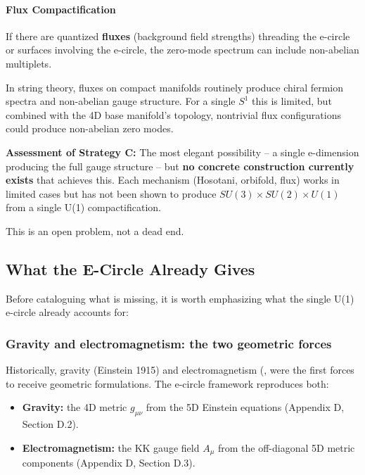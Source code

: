 \documentclass[aps,prd,preprint,superscriptaddress,longbibliography,floatfix]{revtex4-2}
\theoremstyle{remark}
\begin{document}
\paragraph{Flux Compactification}

If there are quantized \textbf{fluxes} (background field strengths) threading the e-circle or surfaces involving the e-circle, the zero-mode spectrum can include non-abelian multiplets.

In string theory, fluxes on compact manifolds routinely produce chiral fermion spectra and non-abelian gauge structure. For a single $S^1$ this is limited, but combined with the 4D base manifold's topology, nontrivial flux configurations could produce non-abelian zero modes.

\textbf{Assessment of Strategy C:} The most elegant possibility -- a single e-dimension producing the full gauge structure -- but \textbf{no concrete construction currently exists} that achieves this. Each mechanism (Hosotani, orbifold, flux) works in limited cases but has not been shown to produce $SU(3) \times SU(2) \times U(1)$ from a single U(1) compactification.

This is an open problem, not a dead end.



\subsection{What the E-Circle Already Gives}

Before cataloguing what is missing, it is worth emphasizing what the single U(1) e-circle already accounts for:


\subsubsection{Gravity and electromagnetism: the two geometric forces}

Historically, gravity (Einstein 1915) and electromagnetism (\cite{Kaluza1921}, \cite{Klein1926} were the first forces to receive geometric formulations. The e-circle framework reproduces both:


\begin{itemize}
  \item \textbf{Gravity:} the 4D metric $g_{\mu\nu}$ from the 5D Einstein equations (Appendix D, Section D.2).
  \item \textbf{Electromagnetism:} the KK gauge field $A_\mu$ from the off-diagonal 5D metric components (Appendix D, Section D.3).
\end{itemize}
\end{document}

